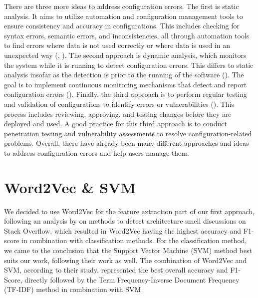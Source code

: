 \documentclass[english,bachelor]{swsLeipzig}
\begin{document}
There are three more ideas to address configuration errors. The first is static analysis. It aims to utilize automation 
and configuration management tools to ensure consistency and accuracy in configurations. This includes checking for syntax errors, semantic errors, and inconsistencies, all through automation tools to find errors where data is not used correctly or where data is used in an unexpected way (\citet{dong:2013}, \citet{johnson:2011}). The second approach is dynamic analysis, which monitors the system while it is running to detect configuration errors. This differs to static analysis insofar as the detection is prior to the running of the software (\citet{bellairs:2023}). The goal is to implement continuous monitoring mechanisms that detect and report configuration errors (\citet{atta:2010}). Finally, the third approach is to perform regular testing and validation of configurations to identify errors or vulnerabilities (\citet{owasp:2023}). This process includes reviewing, approving, and testing changes before they are deployed and used. A good practice for this third approach is to conduct penetration testing and vulnerability assessments to resolve configuration-related problems. Overall, there have already been many different approaches and ideas to address configuration errors and help users manage them.

\section{Word2Vec \& SVM}\label{word2vec_svm}
We decided to use Word2Vec for the feature extraction part of our first approach, following an analysis by \citet{tian:2020} on methods to detect architecture smell discussions on Stack Overflow, which resulted in Word2Vec having the highest accuracy and F1-score in combination with classification methods. For the classification method, we came to the conclusion that the Support Vector Machine (SVM) method best suits our work, following their work as well. The combination of Word2Vec and SVM, according to their study, represented the best overall accuracy and F1-Score, directly followed by the Term Frequency-Inverse Document Frequency (TF-IDF) method in combination with SVM.
\end{document}
